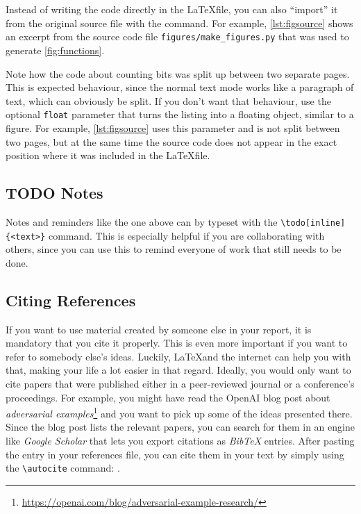 \documentclass[11pt]{article}
\begin{document}
Instead of writing the code directly in the \LaTeX file, you can also ``import'' it from the original source file with the \verb|| command. For example, \cref{lst:figsource} shows an excerpt from the source code file \verb|figures/make_figures.py| that was used to generate \cref{fig:functions}.

Note how the code about counting bits was split up between two separate pages. This is expected behaviour, since the normal text mode works like a paragraph of text, which can obviously be split. If you don't want that behaviour, use the optional \verb|float| parameter that turns the listing into a floating object, similar to a figure. For example, \cref{lst:figsource} uses this parameter and is not split between two pages, but at the same time the source code does not appear in the exact position where it was included in the \LaTeX file.



\subsection{TODO Notes}
Notes and reminders like the one above can by typeset with the \verb|\todo[inline]{<text>}| command. This is especially helpful if you are collaborating with others, since you can use this to remind everyone of work that still needs to be done.

\subsection{Citing References}
If you want to use material created by someone else in your report, it is mandatory that you cite it properly. This is even more important if you want to refer to somebody else's ideas. Luckily, \LaTeX and the internet can help you with that, making your life a lot easier in that regard. Ideally, you would only want to cite papers that were published either in a peer-reviewed journal or a conference's proceedings. For example, you might have read the OpenAI blog post about \emph{adversarial examples}\footnote{\url{https://openai.com/blog/adversarial-example-research/}} and you want to pick up some of the ideas presented there. Since the blog post lists the relevant papers, you can search for them in an engine like \emph{Google Scholar} that lets you export citations as \emph{BibTeX} entries. After pasting the entry in your references file, you can cite them in your text by simply using the \verb|\autocite| command: \autocite{papernot2017practical}.
\end{document}
